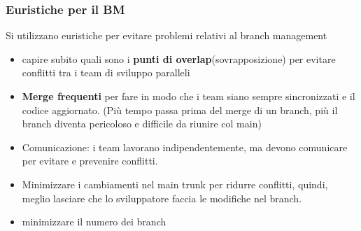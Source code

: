 \documentclass[10pt,a4paper]{book}
\begin{document}
\subsubsection{Euristiche per il BM}
Si utilizzano euristiche per evitare problemi relativi al branch management
\begin{itemize}
\item capire subito quali sono i \textbf{punti di overlap}(sovrapposizione) per evitare conflitti tra i team di sviluppo paralleli
\item \textbf{Merge frequenti} per fare in modo che i team siano sempre sincronizzati e il codice aggiornato. (Più tempo passa prima del merge di un branch, più il branch diventa pericoloso e difficile da riunire col main)
\item Comunicazione: i team lavorano indipendentemente, ma devono comunicare per evitare e prevenire conflitti.
\item Minimizzare i cambiamenti nel main trunk per ridurre conflitti, quindi, meglio lasciare che lo sviluppatore faccia le modifiche nel branch.
\item minimizzare il numero dei branch
\end{itemize}
\end{document}
